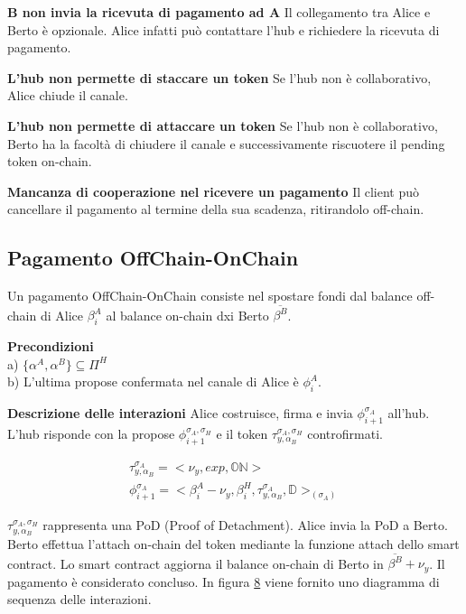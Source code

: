\documentclass[12pt,italian,]{book}
\begin{document}
\textbf{\textbf{B non invia la ricevuta di pagamento ad A}} Il collegamento tra Alice e Berto è opzionale. Alice infatti può contattare l'hub e richiedere la ricevuta di pagamento.

\textbf{\textbf{L'hub non permette di staccare un token}} Se l'hub non è collaborativo, Alice chiude il canale.

\textbf{\textbf{L'hub non permette di attaccare un token}} Se l'hub non è collaborativo, Berto ha la facoltà di chiudere il canale e successivamente riscuotere il pending token on-chain.

\textbf{\textbf{Mancanza di cooperazione nel ricevere un pagamento}} Il client può cancellare il pagamento al termine della sua scadenza, ritirandolo off-chain.

\hypertarget{pagamento-offchain-onchain}{%
\subsection{Pagamento OffChain-OnChain}\label{pagamento-offchain-onchain}}

Un pagamento OffChain-OnChain consiste nel spostare fondi dal balance off-chain di Alice \(\beta^A_i\) al balance on-chain dxi Berto \(\overline{\beta^B}\).

\textbf{\textbf{Precondizioni}}\\
a) \(\{\alpha^A, \alpha^B\} \subseteq \Pi^H\)\\
b) L'ultima propose confermata nel canale di Alice è \(\phi^A_i\).

\textbf{\textbf{Descrizione delle interazioni}} Alice costruisce, firma e invia \(\phi^{\sigma_A}_{i+1}\) all'hub. L'hub risponde con la propose \(\phi^{\sigma_A,\sigma_H}_{i+1}\) e il token \(\tau^{\sigma_A,\sigma_H}_{y, \alpha_B}\) controfirmati.

\begin{equation}
\begin{aligned}
\label{Propose detach pagamento OffChain-OnChain}
\tau^{\sigma_A}_{y, \alpha_B} =  <\nu_y, exp, \mathbb{ON}> \\
\phi^{\sigma_A}_{i+1} = <\beta^A_i-\nu_y, \beta^H_i, \tau^{\sigma_A}_{y, \alpha_B} ,\mathbb{D}>_(\sigma_A)
\end{aligned}
\end{equation}

\(\tau^{\sigma_A,\sigma_H}_{y, \alpha_B}\) rappresenta una PoD (Proof of Detachment). Alice invia la PoD a Berto. Berto effettua l'attach on-chain del token mediante la funzione attach dello smart contract. Lo smart contract aggiorna il balance on-chain di Berto in \(\overline{\beta^B}+\nu_y\). Il pagamento è considerato concluso. In figura \protect\hyperlink{caso-duso-offchain-onchain}{8} viene fornito uno diagramma di sequenza delle interazioni.
\end{document}
